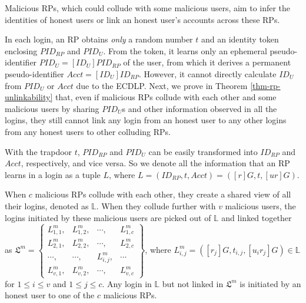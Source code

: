 Malicious RPs,
which could collude with some malicious users,
aim to infer the identities of honest users
    or link an honest user's accounts across these RPs.


In each login, an RP obtains \emph{only} a random number $t$ and an identity token enclosing $PID_{RP}$ and $PID_U$. From the token, it learns only an ephemeral pseudo-identifier $PID_{U} = [{ID_U}]{PID_{RP}}$ of the user, from which it derives a permanent pseudo-identifier $Acct = [ID_U]ID_{RP}$. However, it cannot directly calculate $ID_U$ from $PID_{U}$ or $Acct$ due to the ECDLP.
Next, we prove in Theorem \ref{thm-rp-unlinkability} that, even if malicious RPs collude with each other and some malicious users by sharing $PID_U$s and other information observed in all the logins, they still cannot link any login from an honest user to any other logins from any honest users to other colluding RPs.


With the trapdoor $t$, $PID_{RP}$ and $PID_U$ can be easily transformed into $ID_{RP}$ and $Acct$, respectively, and vice versa.
So we denote all the information that an RP learns in a login as a tuple $L$, where $L =(ID_{RP}, t, Acct)=([r]G, t, [ur]G)$.

When $c$ malicious RPs collude with each other, they create a shared view of all their logins, denoted as $\mathbb{L}$.
When they collude further with $v$ malicious users, the logins initiated by these malicious users are picked out of $\mathbb{L}$ and linked together as
$\mathfrak{L}^m=\left \{ \begin{matrix}
L^m_{1,1},&L^m_{1,2},&\cdots,&L^m_{1,c}\\
L^m_{2,1},& L^m_{2,2},&\cdots,&L^m_{2,c}\\
\cdots,&\cdots,&L^m_{i,j},&\cdots\\
L^m_{v,1},&L^m_{v,2},&\cdots,&L^m_{v,c}
\end{matrix}\right\}$,
where $L^m_{i, j}=([r_j]G, t_{i,j}, [u_ir_j]G) \in \mathbb{L}$ for $1 \le i \le v$ and $1 \le j \le c$. Any login in $\mathbb{L}$ but not linked in $\mathfrak{L}^m$ is initiated by an honest user to one of the $c$ malicious RPs.

